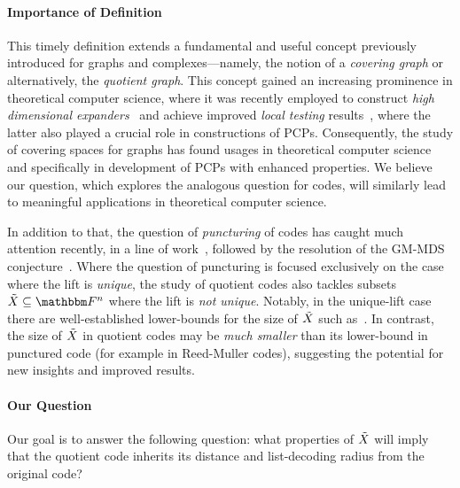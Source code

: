 \paragraph{Importance of Definition}
This timely definition extends a fundamental and useful concept previously introduced for graphs and complexes—namely, the notion of a \emph{covering graph} or alternatively, the \emph{quotient graph}.
This concept gained an increasing prominence in theoretical computer science, where it was recently employed to construct \emph{high dimensional expanders}~\cite{dikstein2022newhighdimensionalexpanders, yaacov2024sparsehighdimensionalexpanders}
and achieve improved \emph{local testing} results~\cite{gotlib2022listagreementexpansioncoboundary, dikstein2024agreementtheoremshighdimensional, bafna2024characterizingdirectproducttesting},
where the latter also played a crucial role in constructions of PCPs.
Consequently, the study of covering spaces for graphs has found usages in theoretical computer science and specifically in development of PCPs with enhanced properties.
We believe our question, which explores the analogous question for codes, will similarly lead to meaningful applications in theoretical computer science.

In addition to that, the question of \emph{puncturing} of codes has caught much attention recently, in a line of work~\cite{brakensiek2024genericreedsolomoncodesachieve, alrabiah2024randomlypuncturedreedsolomoncodes, brakensiek2024generalizedgmmdspolynomialcodes, brakensiek2024agcodesachievelistdecoding},
followed by the resolution of the GM-MDS conjecture~\cite{DBLP:journals/corr/abs-1803-02523, DBLP:journals/corr/abs-1803-03752}.
Where the question of puncturing is focused exclusively on the case where the lift is \emph{unique},
the study of quotient codes also tackles subsets $\variety \subseteq \field$ where the lift is \emph{not unique}.
Notably, in the unique-lift case there are well-established lower-bounds for the size of ${\tilde{X}}$ such as~\cite[Theorem 1.1]{DBLP:journals/cc/DoronTT22}.
In contrast, the size of ${\tilde{X}}$ in quotient codes may be \emph{much smaller} than its lower-bound in punctured code (for example in Reed-Muller codes), suggesting the potential for new insights and improved results.

\paragraph{Our Question}
Our goal is to answer the following question:
what properties of ${\tilde{X}}$ will imply that the quotient code inherits its distance and list-decoding radius from the original code?

